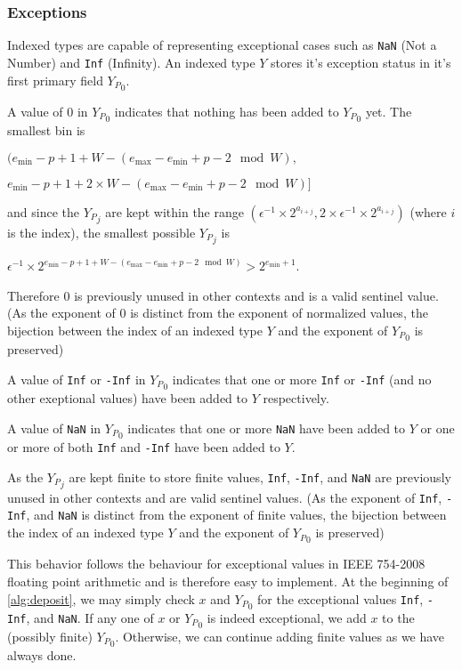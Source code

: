 \documentclass[12pt]{article}
\providecommand{\min}{\ensuremath{\text{min}}}
\providecommand{\max}{\ensuremath{\text{max}}}
\theoremstyle{plain}
\begin{document}
    \subsubsection{Exceptions}
      Indexed types are capable of representing exceptional cases such as \verb|NaN| (Not a Number) and \verb|Inf| (Infinity). An indexed type $Y$ stores it's exception status in it's first primary field ${Y_P}_0$.

      A value of $0$ in ${Y_P}_0$ indicates that nothing has been added to ${Y_P}_0$ yet. The smallest bin is

      $(e_{\min} - p + 1 + W - (e_{\max} - e_{\min} + p - 2 \mod W),$

      \indent \indent $e_{\min} - p + 1 + 2 \times W - (e_{\max} - e_{\min} + p - 2 \mod W)]$

      and since the ${Y_P}_j$ are kept within the range $(\epsilon^{-1} \times 2^{a_{i + j}}, 2 \times \epsilon^{-1} \times 2^{a_{i + j}})$ (where $i$ is the index), the smallest possible ${Y_P}_j$ is

      $\epsilon^{-1} \times 2^{e_{\min} - p + 1 + W - (e_{\max} - e_{\min} + p - 2 \mod W)} > 2^{e_{\min} + 1}$.

      Therefore $0$ is previously unused in other contexts and is a valid sentinel value. (As the exponent of $0$ is distinct from the exponent of normalized values, the bijection between the index of an indexed type $Y$ and the exponent of ${Y_P}_0$ is preserved)

      A value of \verb|Inf| or \verb|-Inf| in ${Y_P}_0$ indicates that one or more \verb|Inf| or \verb|-Inf| (and no other exeptional values) have been added to $Y$ respectively.

      A value of \verb|NaN| in ${Y_P}_0$ indicates that one or more \verb|NaN| have been added to $Y$ or one or more of both \verb|Inf| and \verb|-Inf| have been added to $Y$.

      As the ${Y_P}_j$ are kept finite to store finite values, \verb|Inf|, \verb|-Inf|, and \verb|NaN| are previously unused in other contexts and are valid sentinel values. (As the exponent of \verb|Inf|, \verb|-Inf|, and \verb|NaN| is distinct from the exponent of finite values, the bijection between the index of an indexed type $Y$ and the exponent of ${Y_P}_0$ is preserved)

      This behavior follows the behaviour for exceptional values in IEEE 754-2008 floating point arithmetic and is therefore easy to implement. At the beginning of \ref{alg:deposit}, we may simply check $x$ and ${Y_P}_0$ for the exceptional values \verb|Inf|, \verb|-Inf|, and \verb|NaN|. If any one of $x$ or ${Y_P}_0$ is indeed exceptional, we add $x$ to the (possibly finite) ${Y_P}_0$. Otherwise, we can continue adding finite values as we have always done.
\end{document}
